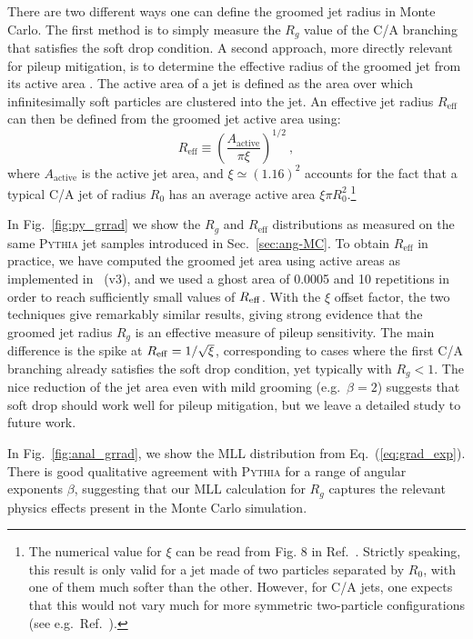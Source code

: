 \documentclass[letterpaper,11pt]{article}
\DeclareRobustCommand{\Sec}[1]{Sec.~\ref{#1}}
\DeclareRobustCommand{\Fig}[1]{Fig.~\ref{#1}}
\DeclareRobustCommand{\Eq}[1]{Eq.~(\ref{#1})}
\DeclareRobustCommand{\Ref}[1]{Ref.~\cite{#1}}
\newcommand{\pythia}[1]{\textsc{Pythia\xspace #1}}
\newcommand{\fastjet}[1]{\textsc{FastJet\xspace #1}}
\begin{document}
There are two different ways one can define the groomed jet radius in
Monte Carlo. The first method is to simply measure the $R_g$ value of
the C/A branching that satisfies the soft drop condition.  A second
approach, more directly relevant for pileup mitigation, is to
determine the effective radius of the groomed jet from its active area
\cite{jet-area}.  The active area of a jet is defined as the area over
which infinitesimally soft particles are clustered into the jet. An
effective jet radius $R_\text{eff}$ can then be defined from the
groomed jet active area using:
\begin{equation}
\label{eq:Reffdef}
R_\text{eff} \equiv \left(\frac{A_\text{active}}{\pi \xi }\right)^{1/2} \ ,
\end{equation}
where $A_\text{active}$ is the active jet area, and $\xi \simeq
(1.16)^2$ accounts for the fact that a typical C/A jet of radius
$R_0$ has an average active area $\xi \pi R_0^2$.\footnote{The
  numerical value for $\xi$ can be read from Fig. 8 in
  \Ref{jet-area}. Strictly speaking, this result is only valid for a jet made of two
  particles separated by $R_0$, with one of them much softer than the other. However, for
  C/A jets, one expects that this would not vary much for more
  symmetric two-particle configurations (see e.g.~\Ref{Sapeta:2010uk}).} 

In \Fig{fig:py_grrad} we show the $R_g$ and $R_\text{eff}$ distributions as measured on the same \pythia{} jet samples introduced in \Sec{sec:ang-MC}. To obtain $R_\text{eff}$ in practice, we have computed the groomed jet area using active areas as implemented in \fastjet~(v3), and we used a ghost area of 0.0005 and 10 repetitions in order to reach sufficiently small values of $R_{\rm eff}$.  With the $\xi$ offset factor, the two techniques give remarkably similar results, giving strong evidence that the groomed jet radius $R_g$ is an effective measure of pileup sensitivity.  The main difference is the spike at $R_{\rm eff} = 1/\sqrt{\xi}$, corresponding to cases where the first C/A branching already satisfies the soft drop condition, yet typically with $R_g < 1$.  The nice reduction of the jet area even with mild grooming (e.g.~$\beta = 2$) suggests that soft drop should work well for pileup mitigation, but we leave a detailed study to future work.

In \Fig{fig:anal_grrad}, we show the MLL distribution from \Eq{eq:grad_exp}.  There is good qualitative agreement with \pythia{} for a range of angular exponents $\beta$, suggesting that our MLL calculation for $R_g$ captures the relevant physics effects present in the Monte Carlo simulation.
\end{document}
